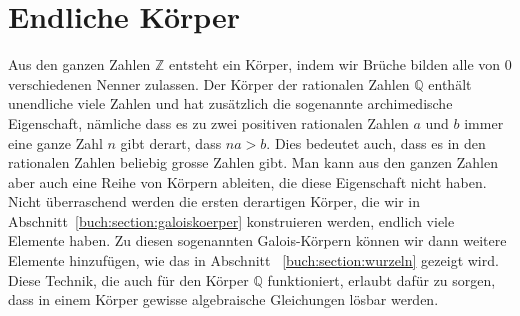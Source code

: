 %
%
%
\chapter{Endliche Körper
\label{buch:chapter:endliche-koerper}}
\rhead{}
Aus den ganzen Zahlen $\mathbb{Z}$ entsteht ein Körper, indem wir Brüche
bilden alle von $0$ verschiedenen Nenner zulassen.
Der Körper der rationalen Zahlen $\mathbb{Q}$ enthält unendliche
viele Zahlen und hat zusätzlich die sogenannte archimedische Eigenschaft,
nämliche dass es zu zwei positiven rationalen Zahlen $a$ und $b$ immer eine
ganze Zahl $n$ gibt derart, dass $na>b$.
Dies bedeutet auch, dass es in den rationalen Zahlen beliebig grosse Zahlen
gibt.
Man kann aus den ganzen Zahlen aber auch eine Reihe von Körpern ableiten,
die diese Eigenschaft nicht haben.
Nicht überraschend werden die ersten derartigen Körper, die wir
in Abschnitt~\ref{buch:section:galoiskoerper} konstruieren werden,
endlich viele Elemente haben.
Zu diesen sogenannten Galois-Körpern können wir dann weitere Elemente
hinzufügen, wie das in Abschnitt ~\ref{buch:section:wurzeln} 
gezeigt wird.
Diese Technik, die auch für den Körper $\mathbb{Q}$ funktioniert, erlaubt
dafür zu sorgen, dass in einem Körper gewisse algebraische Gleichungen
lösbar werden.






